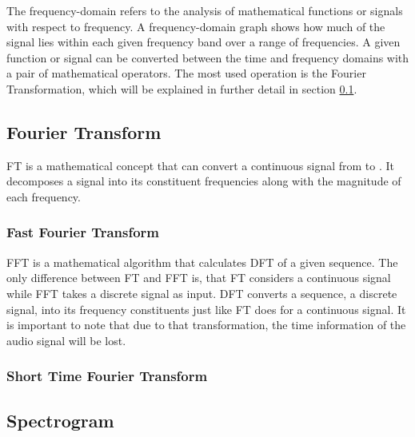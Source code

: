 The frequency-domain refers to the analysis of mathematical functions or signals with respect to frequency. A frequency-domain graph shows how much of the signal lies within each given frequency band over a range of frequencies. 
\newline
\newline
A given function or signal can be converted between the time and frequency domains with a pair of mathematical operators. The most used operation is the Fourier Transformation, which will be explained in further detail in section \ref{sub:Fourier-Transform}.

\subsection{Fourier Transform}
\label{sub:Fourier-Transform}

\gls{FT} is a mathematical concept that can convert a continuous signal from  to . It decomposes a signal into its constituent frequencies along with the magnitude of each frequency.

\subsubsection{Fast Fourier Transform}
\label{subsub:Fast-Fourier-Transform}

\gls{FFT} is a mathematical algorithm that calculates \gls{DFT} of a given sequence. The only difference between \gls{FT} and \gls{FFT} is, that \gls{FT} considers a continuous signal while \gls{FFT} takes a discrete signal as input. \gls{DFT} converts a sequence, a discrete signal, into its frequency constituents just like \gls{FT} does for a continuous signal. It is important to note that due to that transformation, the time information of the audio signal will be lost.

\subsubsection{Short Time Fourier Transform}
\label{subsub:Short-Time-Fourier-Transform}

\subsection{Spectrogram}
\label{sub:Spectrogram}

